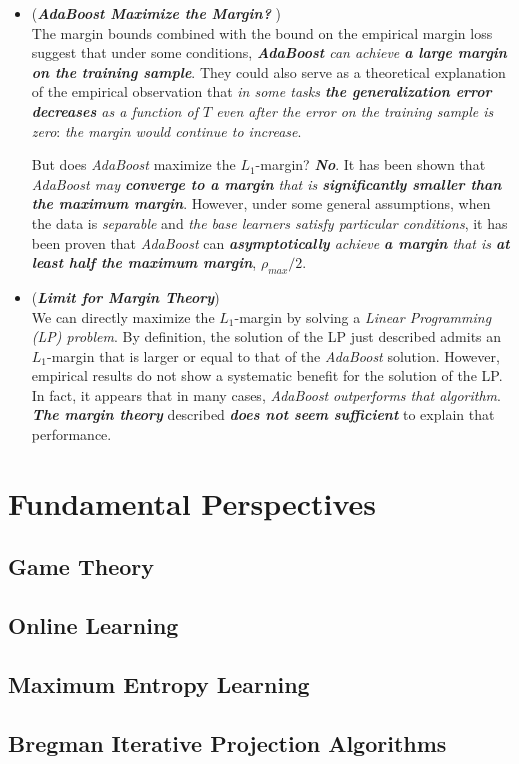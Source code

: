 \documentclass[11pt]{article}
\begin{document}
\begin{itemize}
\item \begin{remark} (\emph{\textbf{AdaBoost Maximize the Margin? }})\\
The margin bounds combined with the bound on the empirical margin loss suggest that under some conditions, \emph{\textbf{AdaBoost} can achieve \textbf{a large margin on the training sample}}. They could also serve as a theoretical explanation of the empirical observation that \emph{in some tasks \textbf{the generalization error decreases} as a function of $T$ even after the error on the training sample is zero}: \emph{the margin would continue to increase}. 

But does \emph{AdaBoost} maximize the $L_1$-margin? \emph{\textbf{No}}. It has been shown that \emph{AdaBoost may \textbf{converge to a margin} that is \textbf{significantly smaller than the maximum margin}}. However, under some general assumptions, when the data is \emph{separable} and \emph{the base learners satisfy particular conditions}, it has been proven that \emph{AdaBoost} can \emph{\textbf{asymptotically} achieve \textbf{a margin} that is \textbf{at least half the maximum margin}}, $\rho_{max}/2$.
\end{remark}

\item \begin{remark} (\emph{\textbf{Limit for Margin Theory}})\\
We can directly maximize the $L_1$-margin by solving a \emph{Linear Programming (LP) problem}. By definition, the solution of the LP just described admits an $L_1$-margin that is larger or equal to that of the \emph{AdaBoost} solution. However, empirical results do not show a systematic benefit for the solution of the LP. In fact, it appears that in many cases, \emph{AdaBoost} \emph{outperforms that algorithm}.  \emph{\textbf{The margin theory}} described \emph{\textbf{does not seem sufficient}} to explain that performance.
\end{remark}
\end{itemize}
\section{Fundamental Perspectives}
\subsection{Game Theory}
\subsection{Online Learning}
\subsection{Maximum Entropy Learning}
\subsection{Bregman Iterative Projection Algorithms}


\newpage


\end{document}
